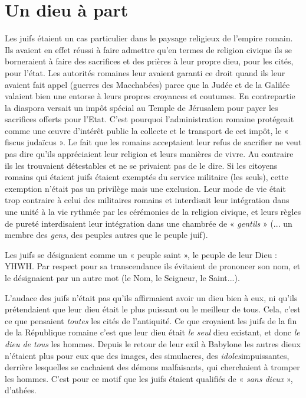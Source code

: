 \section{Un dieu à part}

 Les juifs étaient un cas particulier dans le paysage religieux de l'empire romain. Ils avaient en effet réussi à faire admettre qu'en termes de religion civique ils se borneraient à faire des sacrifices et des prières à leur propre dieu, pour les cités, pour l'état. Les autorités romaines leur avaient garanti ce droit quand ils leur avaient fait appel (guerres des Macchabées) parce que la Judée et de la Galilée valaient bien une entorse à leurs propres croyances et coutumes. En contrepartie la diaspora versait un impôt spécial au Temple de Jérusalem pour payer les sacrifices offerts pour l'Etat. C'est pourquoi l'administration romaine protégeait comme une œuvre d'intérêt public la collecte et le transport de cet impôt, le « fiscus judaïcus ». Le fait que les romains acceptaient leur refus de sacrifier ne veut pas dire qu'ils appréciaient leur religion et leurs manières de vivre. Au contraire ils les trouvaient détestables et ne se privaient pas de le dire. Si les citoyens romains qui étaient juifs étaient exemptés du service militaire (les seuls), cette exemption n'était pas un privilège mais une exclusion. Leur mode de vie était trop contraire à celui des militaires romains et interdisait leur intégration dans une unité à la vie rythmée par les cérémonies de la religion civique, et leurs règles de pureté interdisaient leur intégration dans une chambrée de « \emph{gentils} » (... un membre des \emph{gens}, des peuples autres que le peuple juif). 

 Les juifs se désignaient comme un « peuple saint », le peuple de leur Dieu : YHWH. Par respect pour sa transcendance ils évitaient de prononcer son nom, et le désignaient par un autre mot (le Nom, le Seigneur, le Saint...). 

 L'audace des juifs n'était pas qu'ils affirmaient avoir un dieu bien à eux, ni qu'ils prétendaient que leur dieu était le plus puissant ou le meilleur de tous. Cela, c'est ce que pensaient \emph{toutes} les cités de l'antiquité. Ce que croyaient les juifs de la fin de la République romaine c'est que leur dieu était \emph{le seul} dieu existant, et donc \emph{le dieu de tous} les hommes. Depuis le retour de leur exil à Babylone les autres dieux n'étaient plus pour eux que des images, des simulacres, des \emph{idoles}impuissantes, derrière lesquelles se cachaient des démons malfaisants, qui cherchaient à tromper les hommes. C'est pour ce motif que les juifs étaient qualifiés de « \emph{sans dieux} », d'athées. 

